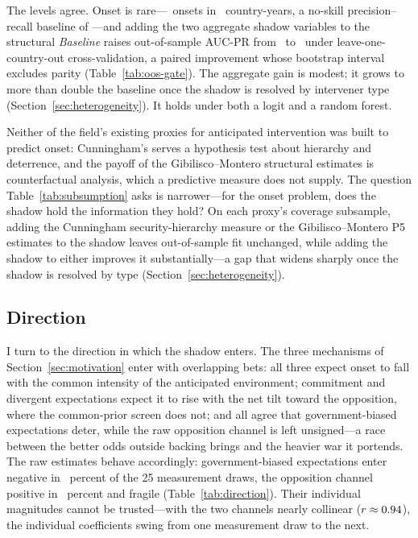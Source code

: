 The levels agree.  Onset is rare---\OosOnsets\ onsets in \OosN\
country-years, a no-skill precision--recall baseline of \OosPrevFloor---and
adding the two aggregate shadow variables to the structural \textit{Baseline}
raises out-of-sample AUC-PR from \OosBaseAucpr\ to \OosEntAucpr\ under
leave-one-country-out cross-validation, a paired improvement whose bootstrap
interval excludes parity (Table~\ref{tab:oos-gate}).  The aggregate gain is
modest; it grows to more than double the baseline once the shadow is resolved
by intervener type (Section~\ref{sec:heterogeneity}).  It holds under both a
logit and a random forest.

Neither of the field's existing proxies for anticipated intervention was
built to predict onset: Cunningham's serves a hypothesis test about hierarchy
and deterrence, and the payoff of the Gibilisco--Montero structural estimates
is counterfactual analysis, which a predictive measure does not supply.  The
question Table~\ref{tab:subsumption} asks is narrower---for the onset
problem, does the shadow hold the information they hold?  On each proxy's
coverage subsample, adding the Cunningham security-hierarchy measure or the
Gibilisco--Montero P5 estimates to the shadow leaves out-of-sample fit
unchanged, while adding the shadow to either improves it
substantially---a gap that widens sharply once the shadow is resolved by
type (Section~\ref{sec:heterogeneity}).







\subsection{Direction}
\label{sec:direction}

I turn to the direction in which the shadow enters.  The three mechanisms of
Section~\ref{sec:motivation} enter with overlapping bets: all three expect
onset to fall with the common intensity of the anticipated environment;
commitment and divergent expectations expect it to rise with the net tilt
toward the opposition, where the common-prior screen does not; and all agree
that government-biased expectations deter, while the raw opposition channel is
left unsigned---a race between the better odds outside backing brings and the
heavier war it portends.  The raw estimates behave accordingly:
government-biased expectations enter negative in \DirGovFrac\ percent of the 25
measurement draws, the opposition channel positive in \DirOppFrac\ percent and
fragile (Table~\ref{tab:direction}).  Their individual magnitudes cannot be
trusted---with the two channels nearly collinear ($r \approx 0.94$), the
individual coefficients swing from one measurement draw to the next.


